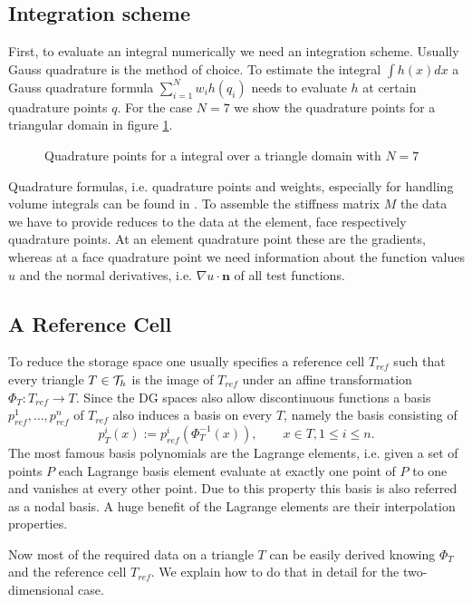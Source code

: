 \subsection{Integration scheme}
First, to evaluate an integral numerically we need an integration scheme. Usually Gauss quadrature is the method of choice. To estimate the integral $\int h(x) dx$ a Gauss quadrature formula $\sum_{i=1}^{N} w_i h(q_i)$ needs to evaluate $h$ at certain quadrature points $q$. For the case $N=7$ we show the quadrature points for a triangular domain in figure \ref{fig: quadrature}.
\begin{figure}[!h]
	\centering
	
	\caption{Quadrature points for a integral over a triangle domain with $N=7$}
	 \label{fig: quadrature}
\end{figure}
Quadrature formulas, i.e. quadrature points and weights, especially for handling volume integrals can be found in \cite{Strout1971}.
To assemble the stiffness matrix $M$ the data we have to provide reduces to the data at the element, face respectively quadrature points.  
At an element quadrature point these are the gradients, whereas at a face quadrature point we need information about  the function values $u$ and the normal derivatives, i.e. $\nabla u \cdot \mathbf{n}$ of all test functions.

\subsection{A Reference Cell}
To reduce the storage space one usually specifies a reference cell $T_{ref}$ such that every triangle $T \in \mathcal{T}_h$ is the image of $T_{ref}$ under an affine transformation $\Phi_T:T_{ref} \rightarrow T$. 
Since the DG spaces also allow discontinuous functions a basis $p^1_{ref},\dots,p^n_{ref}$ of $T_{ref}$ also induces a basis on every $T$, namely the basis consisting of 
\[
	p_T^i(x) := p^i_{ref}(\Phi_T^{-1}(x)), \qquad x \in T, 1 \leq i \leq n.
\]
The most famous basis polynomials are the Lagrange elements, i.e. given a set of points $P$ each Lagrange basis element evaluate at exactly one point of $P$ to one and vanishes at every other point. Due to this property this basis is also referred as a nodal basis. 
A huge benefit of the Lagrange elements are their interpolation properties. 

Now most of the required data on a triangle $T$ can be easily derived knowing $\Phi_T$ and the reference cell $T_{ref}$. We explain how to do that in detail for the two-dimensional case.

